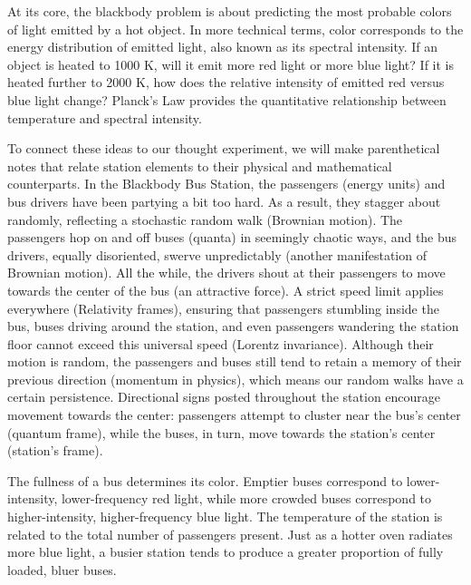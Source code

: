 \documentclass{report}
\begin{document}
At its core, the blackbody problem is about predicting the most probable colors of light emitted by a hot object. In more technical terms, color corresponds to the energy distribution of emitted light, also known as its spectral intensity. If an object is heated to 1000 K, will it emit more red light or more blue light? If it is heated further to 2000 K, how does the relative intensity of emitted red versus blue light change? Planck’s Law provides the quantitative relationship between temperature and spectral intensity.

To connect these ideas to our thought experiment, we will make parenthetical notes that relate station elements to their physical and mathematical counterparts. In the Blackbody Bus Station, the passengers (energy units) and bus drivers have been partying a bit too hard. As a result, they stagger about randomly, reflecting a stochastic random walk (Brownian motion). The passengers hop on and off buses (quanta) in seemingly chaotic ways, and the bus drivers, equally disoriented, swerve unpredictably (another manifestation of Brownian motion). All the while, the drivers shout at their passengers to move towards the center of the bus (an attractive force). A strict speed limit applies everywhere (Relativity frames), ensuring that passengers stumbling inside the bus, buses driving around the station, and even passengers wandering the station floor cannot exceed this universal speed (Lorentz invariance). Although their motion is random, the passengers and buses still tend to retain a memory of their previous direction (momentum in physics), which means our random walks have a certain persistence. Directional signs posted throughout the station encourage movement towards the center: passengers attempt to cluster near the bus’s center (quantum frame), while the buses, in turn, move towards the station’s center (station’s frame).

The fullness of a bus determines its color. Emptier buses correspond to lower-intensity, lower-frequency red light, while more crowded buses correspond to higher-intensity, higher-frequency blue light. The temperature of the station is related to the total number of passengers present. Just as a hotter oven radiates more blue light, a busier station tends to produce a greater proportion of fully loaded, bluer buses.
\end{document}
